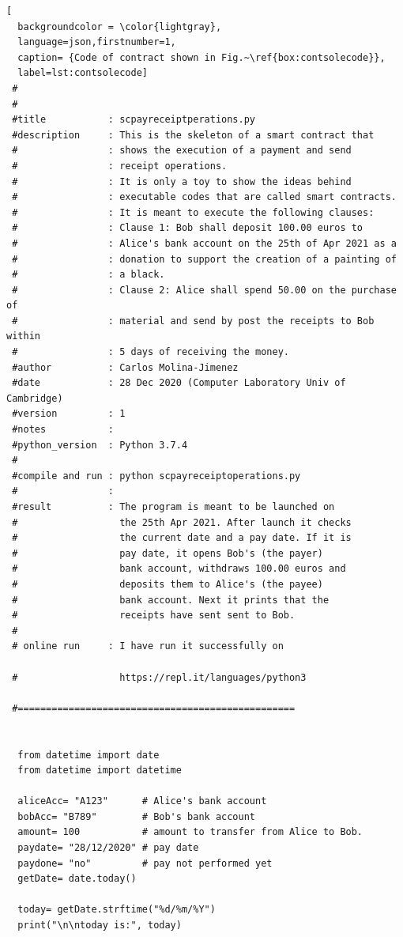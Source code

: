 \documentclass[12pt]{report} %
\begin{document}
\begin{lstlisting}[
  backgroundcolor = \color{lightgray},
  language=json,firstnumber=1,
  caption= {Code of contract shown in Fig.~\ref{box:contsolecode}},
  label=lst:contsolecode]
 #
 #
 #title           : scpayreceiptperations.py
 #description     : This is the skeleton of a smart contract that
 #                : shows the execution of a payment and send
 #                : receipt operations.
 #                : It is only a toy to show the ideas behind
 #                : executable codes that are called smart contracts.
 #                : It is meant to execute the following clauses:
 #                : Clause 1: Bob shall deposit 100.00 euros to
 #                : Alice's bank account on the 25th of Apr 2021 as a
 #                : donation to support the creation of a painting of
 #                : a black.
 #                : Clause 2: Alice shall spend 50.00 on the purchase of
 #                : material and send by post the receipts to Bob within
 #                : 5 days of receiving the money.
 #author          : Carlos Molina-Jimenez
 #date            : 28 Dec 2020 (Computer Laboratory Univ of Cambridge)
 #version         : 1
 #notes           :
 #python_version  : Python 3.7.4
 #
 #compile and run : python scpayreceiptoperations.py
 #                :
 #result          : The program is meant to be launched on
 #                  the 25th Apr 2021. After launch it checks
 #                  the current date and a pay date. If it is
 #                  pay date, it opens Bob's (the payer)
 #                  bank account, withdraws 100.00 euros and
 #                  deposits them to Alice's (the payee)
 #                  bank account. Next it prints that the
 #                  receipts have sent sent to Bob.
 #
 # online run     : I have run it successfully on

 #                  https://repl.it/languages/python3
  
 #=================================================
 
 
  from datetime import date
  from datetime import datetime
  
  aliceAcc= "A123"      # Alice's bank account
  bobAcc= "B789"        # Bob's bank account
  amount= 100           # amount to transfer from Alice to Bob.
  paydate= "28/12/2020" # pay date
  paydone= "no"         # pay not performed yet
  getDate= date.today()
  
  today= getDate.strftime("%d/%m/%Y")
  print("\n\ntoday is:", today)
  

\end{lstlisting}
\end{document}
